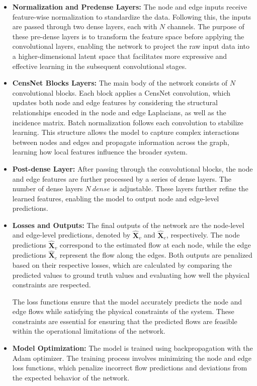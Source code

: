 \begin{itemize}
        
    \item \textbf{Normalization and Pre\-dense Layers:} The node and edge inputs receive feature-wise normalization to standardize the data. Following this, the inputs are passed through two dense layers, each with $N$ channels. The purpose of these pre-dense layers is to transform the feature space before applying the convolutional layers, enabling the network to project the raw input data into a higher-dimensional latent space that facilitates more expressive and effective learning in the subsequent convolutional stages.


    \item \textbf{CensNet Blocks Layers:} The main body of the network consists of \(N\) convolutional blocks. Each block applies a CensNet convolution, which updates both node and edge features by considering the structural relationships encoded in the node and edge Laplacians, as well as the incidence matrix. Batch normalization follows each convolution to stabilize learning. This structure allows the model to capture complex interactions between nodes and edges and propagate information across the graph, learning how local features influence the broader system.
   
    \item \textbf{Post-dense Layer:} After passing through the convolutional blocks, the node and edge features are further processed by a series of dense layers. The number of dense layers $N \ dense$ is adjustable. These layers further refine the learned features, enabling the model to output node and edge-level predictions. 
   
    
    \item \textbf{Losses and Outputs:} The final outputs of the network are the node-level and edge-level predictions, denoted by \(\hat{\mathbf{X}}_v\) and \(\hat{\mathbf{X}}_e\), respectively. The node predictions \(\hat{\mathbf{X}}_v\) correspond to the estimated flow at each node, while the edge predictions \(\hat{\mathbf{X}}_e\) represent the flow along the edges. Both outputs are penalized based on their respective losses, which are calculated by comparing the predicted values to ground truth values and evaluating how well the physical constraints are respected.


The loss functions ensure that the model accurately predicts the node and edge flows while satisfying the physical constraints of the system. These constraints are essential for ensuring that the predicted flows are feasible within the operational limitations of the network. 
    \item \textbf{Model Optimization:} The model is trained using backpropagation with the Adam optimizer. The training process involves minimizing the node and edge loss functions, which penalize incorrect flow predictions and deviations from the expected behavior of the network.


\end{itemize}
